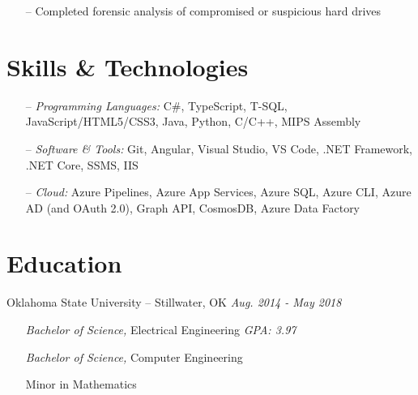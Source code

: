 \documentclass[line,overlapped,9pt]{res}
\begin{document}
\begin{resume}
\begin{itemize}
                  \item[--] Completed forensic analysis of compromised or suspicious
                    hard drives
                  \end{itemize}
%

     \section{Skills \& Technologies}
            \begin{itemize} 
            \setlength\itemsep{.1em}
            \item[--] {\sl Programming Languages:} C\#, TypeScript, T-SQL, JavaScript/HTML5/CSS3, Java, Python, C/C++, MIPS Assembly 
            \item[--] {\sl Software \& Tools:} Git, Angular, Visual Studio, VS Code, .NET Framework, .NET Core,
              SSMS, IIS 
            \item[--] {\sl Cloud:} Azure Pipelines, Azure App Services, Azure SQL,
              Azure CLI, Azure AD (and OAuth 2.0), Graph API, CosmosDB, Azure Data Factory   
            \end{itemize} 

      \section{Education} Oklahoma State University -- Stillwater, OK \hfill {\sl Aug. 2014 - May 2018}
          \begin{itemize}
            \setlength\itemsep{.1em}
            \item[]{\sl Bachelor of Science,} Electrical Engineering \hfill {\sl GPA: 3.97}
            \item[]{\sl Bachelor of Science,} Computer Engineering 
            \item[] Minor in Mathematics 
          \end{itemize}
                

\end{resume}
\end{document}
